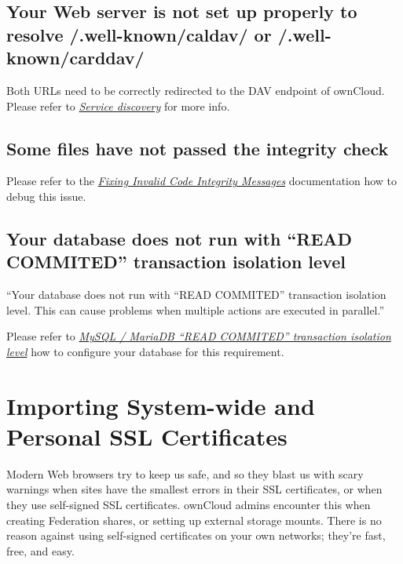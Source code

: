 \documentclass[letterpaper,10pt,english]{sphinxmanual}
\begin{document}
\subsection{Your Web server is not set up properly to resolve /.well-known/caldav/ or /.well-known/carddav/}
\label{configuration_server/security_setup_warnings:your-web-server-is-not-set-up-properly-to-resolve-well-known-caldav-or-well-known-carddav}
Both URLs need to be correctly redirected to the DAV endpoint of ownCloud. Please
refer to {\hyperref[issues/general_troubleshooting:service\string-discovery\string-label]{\emph{Service discovery}}} for more info.


\subsection{Some files have not passed the integrity check}
\label{configuration_server/security_setup_warnings:some-files-have-not-passed-the-integrity-check}
Please refer to the {\hyperref[issues/code_signing:code\string-signing\string-fix\string-warning\string-label]{\emph{Fixing Invalid Code Integrity Messages}}} documentation how to debug this issue.


\subsection{Your database does not run with ``READ COMMITED'' transaction isolation level}
\label{configuration_server/security_setup_warnings:your-database-does-not-run-with-read-commited-transaction-isolation-level}
``Your database does not run with ``READ COMMITED'' transaction isolation level.
This can cause problems when multiple actions are executed in parallel.''

Please refer to {\hyperref[configuration_database/linux_database_configuration:db\string-transaction\string-label]{\emph{MySQL / MariaDB ``READ COMMITED'' transaction isolation level}}} how to configure your database for this requirement.


\section{Importing System-wide and Personal SSL Certificates}
\label{configuration_server/import_ssl_cert:importing-system-wide-and-personal-ssl-certificates}\label{configuration_server/import_ssl_cert::doc}
Modern Web browsers try to keep us safe, and so they blast us with scary warnings when sites have the smallest errors in their SSL certificates, or when they use self-signed SSL certificates. ownCloud admins encounter this when creating Federation shares, or setting up external storage mounts. There is no reason against using self-signed certificates on your own networks; they're fast, free, and easy.
\end{document}
